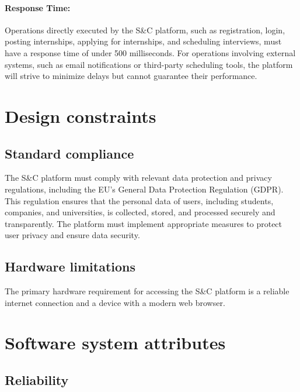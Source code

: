 \paragraph{Response Time:}
  Operations directly executed by the S\&C platform, such as
  registration, login, posting internships, applying for internships,
  and scheduling interviews, must have a response time of under 500
  milliseconds. For operations involving external systems, such as email
  notifications or third-party scheduling tools, the platform will
  strive to minimize delays but cannot guarantee their performance.

\section{Design constraints}
\label{sec:design_constraints}%


\subsection{Standard compliance}
\label{subsec:standard compliance}%


The S\&C platform must comply with relevant data protection and privacy
regulations, including the EU's General Data Protection Regulation
(GDPR). This regulation ensures that the personal data of users,
including students, companies, and universities, is collected, stored,
and processed securely and transparently. The platform must implement
appropriate measures to protect user privacy and ensure data security.


\subsection{Hardware limitations}
\label{subsec:hardware_limitations}%


The primary hardware requirement for accessing the S\&C platform is a
reliable internet connection and a device with a modern web browser.



\section{Software system attributes}
\label{sec:software_system_attributes}%


\subsection{Reliability}
\label{subsec:reliability}%


